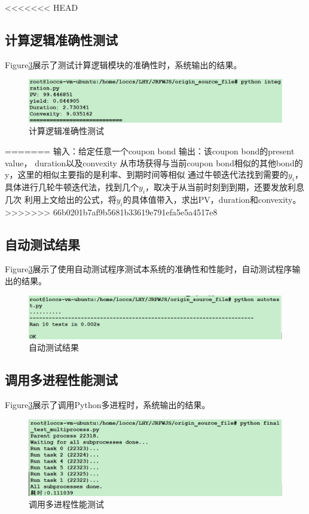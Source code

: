 <<<<<<< HEAD
\subsection{计算逻辑准确性测试}
Figure\ref{fig:sys.param}展示了测试计算逻辑模块的准确性时，系统输出的结果。
\begin{figure}[H]
\begin{center}
\includegraphics[width=16cm]{img//integration.PNG}
\caption{计算逻辑准确性测试}
\label{fig:sys.param}
\end{center}
\end{figure}
=======
输入：给定任意一个coupon bond
输出：该coupon bond的present value， duration以及convexity
	从市场获得与当前coupon bond相似的其他bond的y，这里的相似主要指的是利率、到期时间等相似
	通过牛顿迭代法找到需要的$y_i$，具体进行几轮牛顿迭代法，找到几个$y_i$，取决于从当前时刻到到期，还要发放利息几次
	利用上文给出的公式，将$y_i$的具体值带入，求出PV，duration和convexity。
>>>>>>> 66b0201b7af9b5681b33619e791efa5e5a4517e8


\subsection{自动测试结果}
Figure\ref{fig:sys.param}展示了使用自动测试程序测试本系统的准确性和性能时，自动测试程序输出的结果。
\begin{figure}[H]
\begin{center}
\includegraphics[width=16cm]{img//autotest.PNG}
\caption{自动测试结果}
\label{fig:sys.param}
\end{center}
\end{figure}


\subsection{调用多进程性能测试}
Figure\ref{fig:sys.param}展示了调用Python多进程时，系统输出的结果。
\begin{figure}[H]
\begin{center}
\includegraphics[width=16cm]{img//final_test_multiprocess.PNG}
\caption{调用多进程性能测试}
\label{fig:sys.param}
\end{center}
\end{figure}


